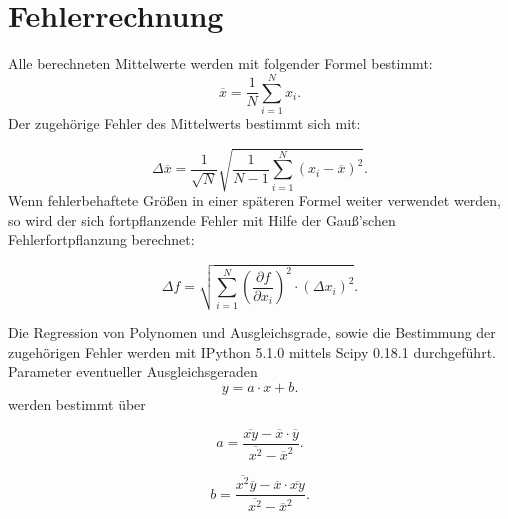 \section{Fehlerrechnung}
\label{sec:fehlerrechnung}
Alle berechneten Mittelwerte werden mit folgender Formel bestimmt:
\begin{equation}
	\label{eqn:mittelwert}
	\overline x=\frac{1}{N}\sum \limits_{i=1}^{N} x_i .
\end{equation}
Der zugehörige Fehler des Mittelwerts bestimmt sich mit:

\begin{equation}
	\label{eqn:mittelwertfehler}
	\Delta \overline x= \frac{1}{\sqrt{N}} \sqrt{\frac{1}{N-1} \sum \limits_{i=1}^{N} (x_i- \overline x)^2}.
\end{equation}
Wenn fehlerbehaftete Größen in einer späteren Formel weiter verwendet werden, so wird der sich fortpflanzende Fehler
mit Hilfe der Gauß’schen Fehlerfortpflanzung berechnet:

\begin{equation}
	\label{eqn:fehlerfortpflanzung}
	\Delta f = \sqrt{ \sum \limits_{i = 1}^{N} (\frac{\partial f}{\partial x_i})^2 \cdot (\Delta x_i)^2}.
\end{equation}


Die Regression von Polynomen und Ausgleichsgrade, sowie die Bestimmung der zugehörigen Fehler werden mit
IPython 5.1.0 mittels Scipy 0.18.1 durchgeführt.
Parameter eventueller Ausgleichsgeraden
\begin{equation}
	\label{eqn:ausgleichsgrade}
	y=a \cdot x +b .
\end{equation}
werden bestimmt über

\begin{equation}
	\label{eqn:ausgleichsgrade_a}
	a= \frac{ \overline{xy}- \overline{x}\cdot \overline{y}}{\overline{x^2}-\overline{x}^2} .
\end{equation}

\begin{equation}
	\label{eqn:ausgleichsgrade_b}
	b= \frac{ \overline{x^2} \overline{y}- \overline{x} \cdot \overline{xy}}{\overline{x^2}-\overline{x}^2} .
\end{equation}
